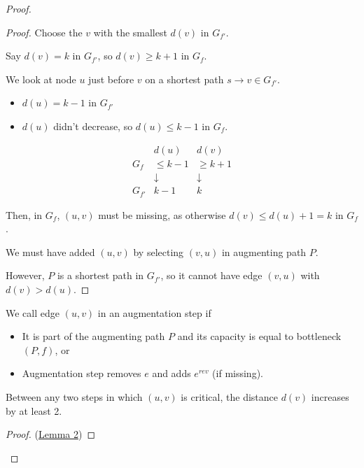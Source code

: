 \begin{itemize}
\begin{proof}
\begin{proof}
            Choose the $v$ with the smallest $d(v)$ in $G_{f'}$.

            Say $d(v) = k$ in $G_{f'}$, so $d(v) \ge k + 1$ in $G_f$.

            We look at node $u$ just before $v$ on a shortest path $s \to v \in G_{f'}$. 

            \begin{itemize}
                \item $d(u) = k - 1$ in $G_{f'}$
                \item $d(u)$ didn't decrease, so $d(u) \le k - 1$ in $G_f$.
            \end{itemize} 
            \[
                \begin{matrix}
                           & d(u)       & d(v)       \\
                    G_f    & \le k - 1  & \ge k + 1  \\
                           & \downarrow & \downarrow \\
                    G_{f'} & k - 1      & k
                \end{matrix}
            \]

            Then, in $G_f$, $(u, v)$ must be missing, as otherwise $d(v) \le d(u) + 1 = k$ in $G_f$.

            We must have added $(u, v)$ by selecting $(v, u)$ in augmenting path $P$.

            However, $P$ is a shortest path in $G_{f'}$, so it cannot have edge $(v, u)$ with $d(v) > d(u)$.
        \end{proof}

        We call edge $(u, v)$  in an augmentation step if 
        \begin{itemize}
            \item It is part of the augmenting path $P$ and its capacity is equal to bottleneck$(P, f)$, or
            \item Augmentation step removes $e$ and adds $e^{rev}$ (if missing).
        \end{itemize}

        \begin{lemma*}[2]\label{lem:edmonds-karp-2}
            Between any two steps in which $(u, v)$ is critical, the distance $d(v)$ increases by at least 2.
        \end{lemma*}

        \begin{proof}(\hyperref[lem:edmonds-karp-2]{Lemma 2})
            

\end{proof}
\end{proof}
\end{itemize}
